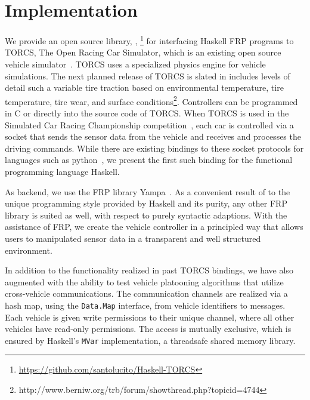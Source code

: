 \section{Implementation}

We provide an open source library, \ourLib, \footnote{\url{https://github.com/santolucito/Haskell-TORCS}} for interfacing Haskell FRP programs to TORCS, The Open Racing Car Simulator, which is an existing open source vehicle simulator~\cite{torcs}.
TORCS uses a specialized physics engine for vehicle simulations. 
The next planned release of TORCS is slated in includes levels of detail such a variable tire traction based on environmental temperature, tire temperature, tire wear, and surface conditions\footnote{http://www.berniw.org/trb/forum/showthread.php?topicid=4744}.
Controllers can be programmed in C or \CC directly into the source code of TORCS.
When TORCS is used in the Simulated Car Racing Championship competition~\cite{SCRC}, each car is controlled via a socket that sends the sensor data from the vehicle and receives and processes the driving commands.
While there are existing bindings to these socket protocols for languages such as python~\cite{snakeoil,pyscrc}, we present the first such binding for the functional programming language Haskell.

As backend, we use the FRP library Yampa~\cite{courtney2003yampa}. 
As a convenient result of to the unique programming style provided by Haskell and its purity, any other FRP library is suited as well, with respect to purely syntactic adaptions.
With the assistance of FRP, we create the  vehicle controller in a principled way that allows users to manipulated sensor data in a transparent and well structured environment.



In addition to the functionality realized in past TORCS bindings, we have also augmented \ourLib with the ability to test vehicle platooning algorithms that utilize cross-vehicle communications.
The communication channels are realized via a hash map, using the \texttt{Data.Map} interface, from vehicle identifiers to messages.
Each vehicle is given write permissions to their unique channel, where all other vehicles have read-only permissions.
The access is mutually exclusive, which is ensured by Haskell's \texttt{MVar} implementation, a threadsafe shared memory library. %
